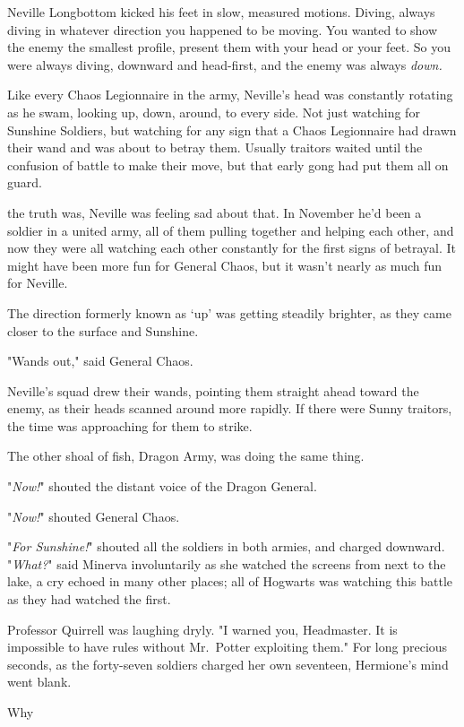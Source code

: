 Neville Longbottom kicked his feet in slow, measured motions. Diving, always
diving in whatever direction you happened to be moving. You wanted to show the
enemy the smallest profile, present them with your head or your feet. So you
were always diving, downward and head-first, and the enemy was always
\emph{down.}

Like every Chaos Legionnaire in the army, Neville's head was constantly
rotating as he swam, looking up, down, around, to every side. Not just watching
for Sunshine Soldiers, but watching for any sign that a Chaos Legionnaire had
drawn their wand and was about to betray them. Usually traitors waited until
the confusion of battle to make their move, but that early gong had put them
all on guard.

{\el} the truth was, Neville was feeling sad about that. In November he'd
been a soldier in a united army, all of them pulling together and helping each
other, and now they were all watching each other constantly for the first signs
of betrayal. It might have been more fun for General Chaos, but it wasn't
nearly as much fun for Neville.

The direction formerly known as `up' was getting steadily brighter, as they
came closer to the surface and Sunshine.

"Wands out," said General Chaos.

Neville's squad drew their wands, pointing them straight ahead toward the
enemy, as their heads scanned around more rapidly. If there were Sunny
traitors, the time was approaching for them to strike.

The other shoal of fish, Dragon Army, was doing the same thing.

"\emph{Now!}" shouted the distant voice of the Dragon General.

"\emph{Now!}" shouted General Chaos.

"\emph{For Sunshine!}" shouted all the soldiers in both armies, and charged
downward.
\sbreak
"\emph{What?}" said Minerva involuntarily as she watched the screens from next
to the lake, a cry echoed in many other places; all of Hogwarts was watching
this battle as they had watched the first.

Professor Quirrell was laughing dryly. "I warned you, Headmaster. It is
impossible to have rules without Mr.~Potter exploiting them."
\sbreak
For long precious seconds, as the forty-seven soldiers charged her own
seventeen, Hermione's mind went blank.

Why{\el}

